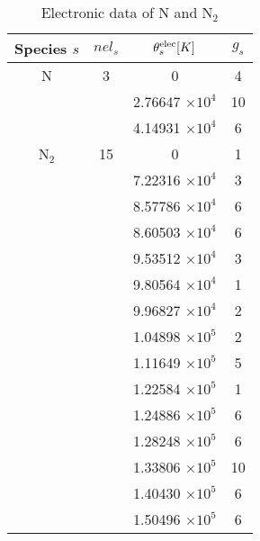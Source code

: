 \begin{table}[ht]\small
\caption{Electronic data of N and N$_2$}
\centering
\begin{tabular}{c c c c}
\hline\hline
Species $s$  &  $nel_s$ & $\theta_{s}^{\text{elec}} [K]$ & $g_s$ \\ [0.5ex]
\hline 
N & 3 &  0   &    4  \\
& &	  2.76647 $\times 10^4$     & 10  \\
& &	  4.14931 $\times 10^4$     & 6  \\
\hline
N$_2$ & 15  &  0  &    1  \\
& &       7.22316 $\times 10^4$  &    3  \\
& &       8.57786 $\times 10^4$  &    6  \\
& &       8.60503 $\times 10^4$  &    6  \\
& &       9.53512 $\times 10^4$  &    3  \\
& &       9.80564 $\times 10^4$  &    1  \\
& &       9.96827 $\times 10^4$  &    2  \\
& &       1.04898 $\times 10^5$  &    2  \\
& &       1.11649 $\times 10^5$  &    5  \\
& &       1.22584 $\times 10^5$  &    1  \\
& &       1.24886 $\times 10^5$  &    6  \\
& &       1.28248 $\times 10^5$  &    6  \\
& &       1.33806 $\times 10^5$  &   10  \\
& &       1.40430 $\times 10^5$  &    6  \\
& &       1.50496 $\times 10^5$  &    6  \\ [.5ex]
\hline
\end{tabular}
\label{table02}
\end{table} 


